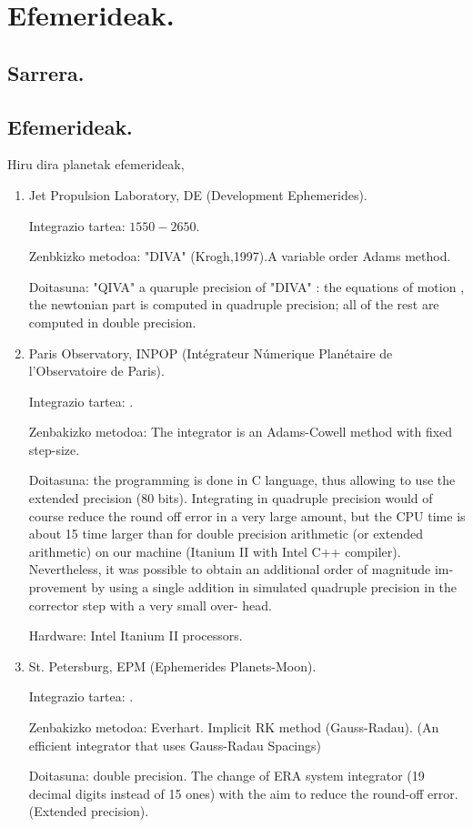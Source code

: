 \chapter{Efemerideak.}

\section{Sarrera.}

\section{Efemerideak.}

Hiru dira planetak efemerideak,

\begin{enumerate}
\item Jet Propulsion Laboratory, DE (Development Ephemerides).

      Integrazio tartea: $1550-2650$.

      Zenbkizko metodoa: "DIVA" (Krogh,1997).A variable order Adams method.
      
      Doitasuna: "QIVA" a quaruple precision of "DIVA" : the equations of motion , the newtonian part is computed in quadruple precision; all of the rest are computed in double precision.

\item Paris Observatory, INPOP (Intégrateur Númerique Planétaire de l'Observatoire de Paris).
      
      Integrazio tartea: .
      
	  Zenbakizko metodoa: The integrator is an Adams-Cowell method with fixed step-size.
	  
	  Doitasuna:  the programming is done in C language, thus allowing to use the extended precision (80 bits). 
	  Integrating in quadruple precision would of course reduce the round off error in a very large amount, but the
	  CPU time is about 15 time larger than for double precision arithmetic (or extended arithmetic) on our machine
	  (Itanium II with Intel C++ compiler). Nevertheless, it was possible to obtain an additional order of magnitude im-
	  provement by using a single addition in simulated quadruple precision in the corrector step with a very small over-
	  head.
	  
	  Hardware: Intel Itanium II processors.
	  
\item St. Petersburg, EPM (Ephemerides Planets-Moon).
      
      Integrazio tartea: .
      
      Zenbakizko metodoa: Everhart. Implicit RK method (Gauss-Radau).
      (An efficient integrator that uses Gauss-Radau Spacings)
      
      Doitasuna: double precision. The change of ERA system integrator (19 decimal digits instead of 15 ones) with the aim to reduce the round-off error. (Extended precision).
      
\end{enumerate}

